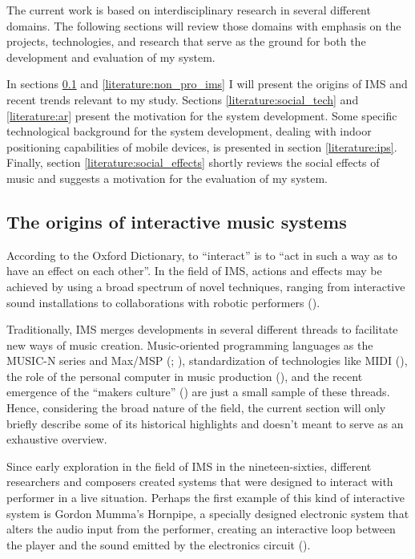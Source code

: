 \documentclass[a4paper,11pt]{article}
\begin{document}
The current work is based on interdisciplinary research in several different domains.
The following sections will review those domains with emphasis on the projects, technologies, and research that serve as the ground for both the development and evaluation of my system.

In sections \ref{literature:ims} and \ref{literature:non_pro_ims} I will present the origins of IMS and recent trends relevant to my study.
Sections \ref{literature:social_tech} and \ref{literature:ar} present the motivation for the system development.
Some specific technological background for the system development, dealing with indoor positioning capabilities of mobile devices, is presented in section \ref{literature:ips}.
Finally, section \ref{literature:social_effects} shortly reviews the social effects of music and suggests a motivation for the evaluation of my system.

\subsection{The origins of interactive music systems} \label{literature:ims}

According to the Oxford Dictionary, to ``interact'' is to ``act in such a way as to have an effect on each other''.
In the field of IMS, actions and effects may be achieved by using a broad spectrum of novel techniques, ranging from interactive sound installations to collaborations with robotic performers (\cite{drummond09}).

Traditionally, IMS merges developments in several different threads to facilitate new ways of music creation.
Music-oriented programming languages as the MUSIC-N series and Max/MSP (\cite{mathews69}; \cite[p. 16]{winkler01}), standardization of technologies like MIDI (\cite{web:quinn}), the role of the personal computer in music production (\cite{leider:04}), and the recent emergence of the ``makers culture'' (\cite{kuznetsov2010rise}) are just a small sample of these threads.
Hence, considering the broad nature of the field, the current section will only briefly describe some of its historical highlights and doesn't meant to serve as an exhaustive overview.

Since early exploration in the field of IMS in the nineteen-sixties, different researchers and composers created systems that were designed to interact with performer in a live situation.
Perhaps the first example of this kind of interactive system is Gordon Mumma's Hornpipe, a specially designed electronic system that alters the audio input from the performer, creating an interactive loop between the player and the sound emitted by the electronics circuit (\cite[p. 12]{winkler01}).
\end{document}
